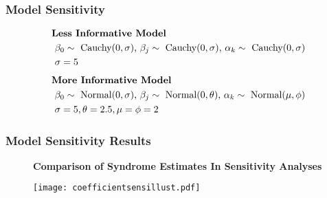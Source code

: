 \documentclass{beamer}
\begin{document}
\begin{frame}
\frametitle{Model Sensitivity}
\begin{equation}
\begin{split}
& \text{\bf{Less Informative Model}} \\
&\text{    } \beta_0 \sim\ \text{Cauchy}(0,\sigma) \text{, } \beta_{j} \sim\ \text{Cauchy}(0,\sigma) \text{, } \alpha_k \sim\ \text{Cauchy}(0,\sigma) \\
&\text{   } \sigma=5
\end{split}
\end{equation}
\begin{equation}
\begin{split}
& \text{\bf{More Informative Model}} \\
&\text{    } \beta_0 \sim\ \text{Normal}(0,\sigma) \text{, } \beta_{j} \sim\ \text{Normal}(0,\theta) \text{, } \alpha_k \sim\ \text{Normal}(\mu,\phi) \\
&\text{   } \sigma=5, \theta=2.5, \mu=\phi=2
\end{split}
\end{equation}
\end{frame}

\begin{frame}
\frametitle{Model Sensitivity Results}
\begin{figure}
\centering
\textbf{Comparison of Syndrome Estimates In Sensitivity Analyses}\par\medskip
\centering
  \texttt{[image: coefficientsensillust.pdf]}
  \label{SynCoefEstSens}
\end{figure}
\end{frame}
\end{document}

